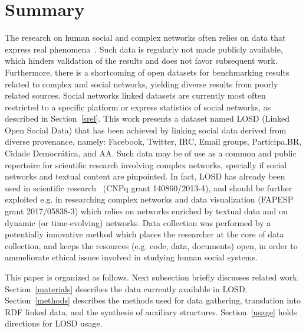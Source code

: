 \documentclass[data,datadescriptor,submit,moreauthors,pdftex]{Definitions/mdpi}
\begin{document}
\section{Summary}
The research on human social and complex networks often
relies on data that express real phenomena~\cite{c1,c2,c3}.
Such data is regularly not made publicly available,
which hinders validation of the results
and does not favor subsequent work.
Furthermore, there is a shortcoming of open datasets for benchmarking results
related to complex and social networks,
yielding diverse results from poorly related sources.
Social networks linked datasets are currently most often restricted to a specific platform
or express statistics of social networks, as described in Section~\ref{srel}.
This work presents 
a dataset named LOSD (Linked Open Social Data)
that has been achieved by linking social data derived from diverse
provenance, namely: Facebook, Twitter, IRC, Email groups, Participa.BR, Cidade Democrática, and AA.
Such data may be of use as a common and public repertoire for scientific
research involving complex networks, specially if social networks and textual content are pinpointed.
In fact, LOSD has already been used in scientific research~\cite{stab,thesis} (CNPq grant 140860/2013-4),
and should be further exploited e.g. in researching complex networks and data visualization (FAPESP grant 2017/05838-3)
which relies on networks enriched by textual data and on dynamic (or time-evolving) networks.
Data collection was performed by a potentially innovative method which places the researcher
at the core of data collection, and keeps the resources (e.g. code, data, documents) open,
in order to ammeliorate ethical issues involved in studying human social systems.

This paper is organized as follows. Next subsection briefly discusses related work.
Section~\ref{materials} describes the data currently available in LOSD.
Section~\ref{methods} describes the methods used for data gathering,
translation into RDF linked data, and the synthesis of auxiliary structures.
Section~\ref{usage} holds directions for LOSD usage. 
\end{document}
